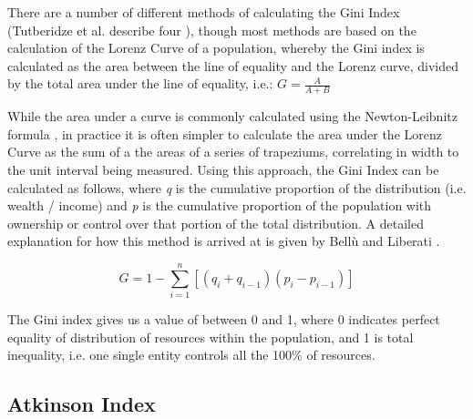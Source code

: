 \documentclass[conference]{IEEEtran}
\begin{document}
There are a number of different methods of calculating the Gini Index (Tutberidze et al. describe four \cite{tutberidze2018measuring}), though most methods are based on the calculation of the Lorenz Curve of a population, whereby the Gini index is calculated as the area between the line of equality and the Lorenz curve, divided by the total area under the line of equality, i.e.: \(G=\frac{A}{A+B}\)


While the area under a curve is commonly calculated using the Newton-Leibnitz formula \cite{kalinski2016}, in practice it is often simpler to calculate the area under the Lorenz Curve as the sum of a the areas of a series of trapeziums, correlating in width to the unit interval being measured.  Using this approach, the Gini Index can be calculated as follows, where \textit{q} is the cumulative proportion of the distribution (i.e. wealth / income) and \textit{p} is the cumulative proportion of the population with ownership or control over that portion of the total distribution.  A detailed explanation for how this method is arrived at is given by Bellù and Liberati \cite{bellu2006inequality}.

\[G=1-\sum_{i=1}^{n}\left[ \left( q_{i}+q_{i-1} \right) \left( p_{i}-p_{i-1} \right) \right]\]

The Gini index gives us a value of between 0 and 1, where 0 indicates perfect equality of distribution of resources within the population, and 1 is total inequality, i.e. one single entity controls all the 100\% of resources.

\subsection{Atkinson Index}
\end{document}
